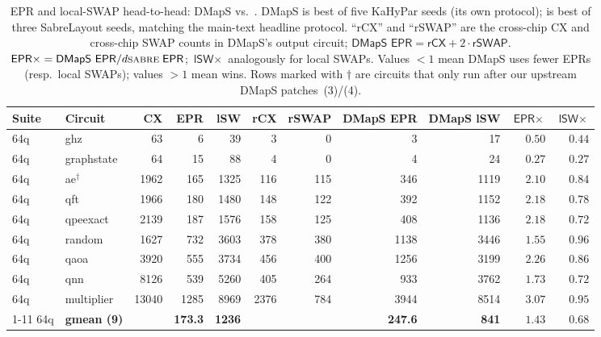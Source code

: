 \begin{table}[t]
\centering
\caption{EPR and local-SWAP head-to-head: DMapS vs.\ \dSABRE{}.
  DMapS is best of five KaHyPar seeds (its own protocol); \dSABRE{} is
  best of three SabreLayout seeds, matching the main-text headline
  protocol.  ``rCX'' and ``rSWAP'' are the cross-chip CX and
  cross-chip SWAP counts in DMapS's output circuit;
  $\textsf{DMapS EPR} = \textsf{rCX} + 2\!\cdot\!\textsf{rSWAP}$.
  $\textsf{EPR}\times = \textsf{DMapS EPR} / d\textsc{sabre}{}\;\textsf{EPR}$;
  $\textsf{lSW}\times$ analogously for local SWAPs.
  Values $<1$ mean DMapS uses fewer EPRs (resp.\ local SWAPs); values
  $>1$ mean \dSABRE{} wins.  Rows marked with $\dagger$ are circuits that
  only run after our upstream DMapS patches~(3)/(4).}
\label{tab:dmaps_vs_dsabre}
\setlength{\tabcolsep}{4pt}
\small
\begin{tabular}{@{}l l r r r r r r r r r@{}}
\toprule
Suite & Circuit & CX & \dSABRE{} EPR & \dSABRE{} lSW & rCX & rSWAP & DMapS EPR & DMapS lSW & $\textsf{EPR}\times$ & $\textsf{lSW}\times$ \\
\midrule
64q & ghz        &   63 &    6 &    39 &    3 &    0 &      3 &      17 & $0.50$ & $0.44$ \\
64q & graphstate &   64 &   15 &    88 &    4 &    0 &      4 &      24 & $0.27$ & $0.27$ \\
64q & ae$^{\dagger}$ & 1962 &  165 &  1325 &  116 &  115 &    346 &    1119 & \textbf{$2.10$} & $0.84$ \\
64q & qft        & 1966 &  180 &  1480 &  148 &  122 &    392 &    1152 & \textbf{$2.18$} & $0.78$ \\
64q & qpeexact   & 2139 &  187 &  1576 &  158 &  125 &    408 &    1136 & \textbf{$2.18$} & $0.72$ \\
64q & random     & 1627 &  732 &  3603 &  378 &  380 &   1138 &    3446 & \textbf{$1.55$} & $0.96$ \\
64q & qaoa       & 3920 &  555 &  3734 &  456 &  400 &   1256 &    3199 & \textbf{$2.26$} & $0.86$ \\
64q & qnn        & 8126 &  539 &  5260 &  405 &  264 &    933 &    3762 & \textbf{$1.73$} & $0.72$ \\
64q & multiplier & 13040 & 1285 &  8969 & 2376 &  784 &   3944 &    8514 & \textbf{$3.07$} & $0.95$ \\
\cmidrule(lr){1-11}
64q & \textbf{gmean (9)} & & \textbf{173.3} & \textbf{1236} & & & \textbf{247.6} & \textbf{841} & \textbf{$1.43$} & $0.68$ \\
\bottomrule
\end{tabular}
\end{table}

